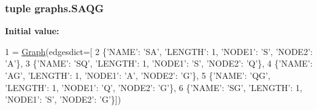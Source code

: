 \subsubsection[{S\+A\+Q\+G}]{\setlength{\rightskip}{0pt plus 5cm}tuple graphs.\+S\+A\+Q\+G}\label{namespacegraphs_ab79b321ca7aaeaa5719c63f369ccc780}
{\bfseries Initial value\+:}
\begin{DoxyCode}
1 = \hyperlink{classsearch_1_1_graph}{Graph}(edgesdict=[
2     \{\textcolor{stringliteral}{'NAME'}: \textcolor{stringliteral}{'SA'}, \textcolor{stringliteral}{'LENGTH'}: 1, \textcolor{stringliteral}{'NODE1'}: \textcolor{stringliteral}{'S'}, \textcolor{stringliteral}{'NODE2'}: \textcolor{stringliteral}{'A'}\},
3     \{\textcolor{stringliteral}{'NAME'}: \textcolor{stringliteral}{'SQ'}, \textcolor{stringliteral}{'LENGTH'}: 1, \textcolor{stringliteral}{'NODE1'}: \textcolor{stringliteral}{'S'}, \textcolor{stringliteral}{'NODE2'}: \textcolor{stringliteral}{'Q'}\},
4     \{\textcolor{stringliteral}{'NAME'}: \textcolor{stringliteral}{'AG'}, \textcolor{stringliteral}{'LENGTH'}: 1, \textcolor{stringliteral}{'NODE1'}: \textcolor{stringliteral}{'A'}, \textcolor{stringliteral}{'NODE2'}: \textcolor{stringliteral}{'G'}\},
5     \{\textcolor{stringliteral}{'NAME'}: \textcolor{stringliteral}{'QG'}, \textcolor{stringliteral}{'LENGTH'}: 1, \textcolor{stringliteral}{'NODE1'}: \textcolor{stringliteral}{'Q'}, \textcolor{stringliteral}{'NODE2'}: \textcolor{stringliteral}{'G'}\},
6     \{\textcolor{stringliteral}{'NAME'}: \textcolor{stringliteral}{'SG'}, \textcolor{stringliteral}{'LENGTH'}: 1, \textcolor{stringliteral}{'NODE1'}: \textcolor{stringliteral}{'S'}, \textcolor{stringliteral}{'NODE2'}: \textcolor{stringliteral}{'G'}\}])
\end{DoxyCode}
